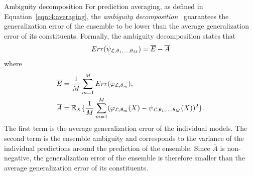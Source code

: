 \begin{remark}{Ambiguity decomposition}
For prediction averaging, as defined in Equation~\ref{eqn:4:averaging},
the \textit{ambiguity decomposition}~\citep{krogh:1995}
guarantees the generalization error of the ensemble to be lower
than the average generalization error of its constituents. Formally,
the ambiguity decomposition states that
\begin{equation}
Err(\psi_{{\cal L},\theta_1,\dots,\theta_M}) = \overline{E} - \overline{A}
\end{equation}
where
\begin{align}
\overline{E} &= \frac{1}{M} \sum_{m=1}^M Err(\varphi_{{\cal L},\theta_m}), \\
\overline{A} &= \mathbb{E}_{X} \{ \frac{1}{M} \sum_{m=1}^M (\varphi_{{\cal L},\theta_m}(X) - \psi_{{\cal L},\theta_1,\dots,\theta_M}(X))^2 \}.
\end{align}
The first term is the average generalization error of the individual models. The second term is the ensemble ambiguity and
corresponds to the variance of the individual predictions around the prediction of the ensemble. Since $\overline{A}$ is non-negative,
the generalization error of the ensemble is therefore smaller than the average generalization
error of its constituents.
\end{remark}

